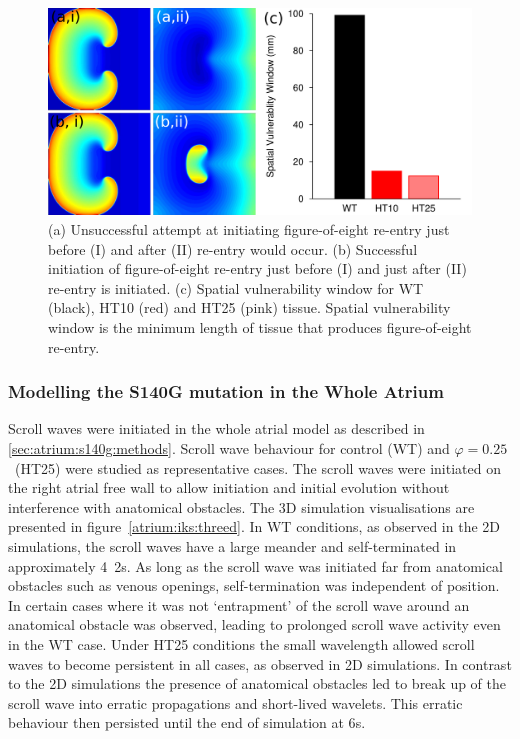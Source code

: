 \begin{figure}
\includegraphics{figures/atrium/iks/07_svw}
\caption[Spatial Vulnerability Window with S140G mutation]{
\label{atrium:iks:svw}
(a) Unsuccessful attempt at initiating figure-of-eight re-entry just
before (I) and after (II) re-entry would occur.
(b) Successful initiation of figure-of-eight re-entry just before (I) and
just after (II) re-entry is initiated.
(c) Spatial vulnerability window for WT (black), HT10 (red) and HT25
(pink) tissue.
Spatial vulnerability window is the minimum length of tissue that produces
figure-of-eight re-entry.
}
\end{figure}

\subsubsection{Modelling the S140G mutation in the Whole Atrium}

Scroll waves were initiated in the whole atrial model as described in
\ref{sec:atrium:s140g:methods}.
Scroll wave behaviour for control (WT) and $\varphi = 0.25$\ (HT25) were studied
as representative cases.
The scroll waves were initiated on the right atrial free wall to allow
initiation and initial evolution without interference with anatomical obstacles.
The 3D simulation visualisations are presented in
figure~\ref{atrium:iks:threed}.
In WT conditions, as observed in the 2D simulations, the scroll waves have a
large meander and self-terminated in approximately \unit{4.2}{s}.
As long as the scroll wave was initiated far from anatomical obstacles such as
venous openings, self-termination was independent of position.
In certain cases where it was not `entrapment' of the scroll wave around an
anatomical obstacle was observed, leading to prolonged scroll wave activity even
in the WT case.
Under HT25 conditions the small wavelength allowed scroll waves to become
persistent in all cases, as observed in 2D simulations.
In contrast to the 2D simulations the presence of anatomical obstacles led to break up of the
scroll wave into erratic propagations and short-lived wavelets.
This erratic behaviour then persisted until the end of simulation at
\unit{6}{s}.

